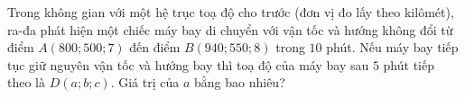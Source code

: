 \begin{bt}%
	Trong không gian với một hệ trục toạ độ cho trước (đơn vị đo lấy theo kilômét), ra-đa phát hiện một chiếc máy bay di chuyển với vận tốc và hướng không đổi từ điểm $A(800;500;7)$ đến điểm $B(940;550;8)$ trong $10$ phút. Nếu máy bay tiếp tục giữ nguyên vận tốc và hướng bay thì toạ độ của máy bay sau $5$ phút tiếp theo là $D(a;b;c)$. Giá trị của $a$ bằng bao nhiêu?
	\begin{center}
	\end{center}
\end{bt}

